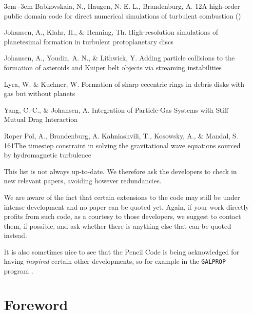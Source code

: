 \documentclass[\mydriver,12pt,twoside,notitlepage,a4paper]{article}
\begin{document}
\begin{list}{}{\leftmargin 3em \itemindent -3em\listparindent \itemindent
\itemsep 0pt \parsep 1pt}
Babkovskaia, N., Haugen, N. E. L., Brandenburg, A.
{12}{A high-order public domain code for direct numerical simulations of turbulent combustion}
()

Johansen, A., Klahr, H., \& Henning, Th.
{High-resolution simulations of planetesimal formation in turbulent protoplanetary discs}

Johansen, A., Youdin, A. N., \& Lithwick, Y.
{Adding particle collisions to the formation of asteroids and Kuiper belt objects via streaming instabilities}

Lyra, W. \& Kuchner, W. 
{Formation of sharp eccentric rings in debris disks with gas but without planets}

Yang, C.-C., \& Johansen, A.
{Integration of Particle-Gas Systems with Stiff Mutual Drag Interaction}

Roper Pol, A., Brandenburg, A. Kahniashvili, T., Kosowsky, A., \& Mandal, S.
{161}{The timestep constraint in solving the gravitational wave equations sourced by hydromagnetic turbulence}

\end{list}
This list is not always up-to-date.
We therefore ask the developers to check in new relevant papers,
avoiding however redundancies.

We are aware of the fact that certain extensions to the code may
still be under intense development and no paper can be quoted yet.
Again, if your work directly profits from such code,
as a courtesy to those developers, we suggest to contact them,
if possible, and ask whether there is anything else that can be quoted
instead.

It is also sometimes nice to see that the {\sc Pencil Code} is being
acknowledged for having {\em inspired} certain other developments,
so for example in the {\tt GALPROP} program \cite{Porter+22}.

\clearpage


\section*{Foreword}
\end{document}
